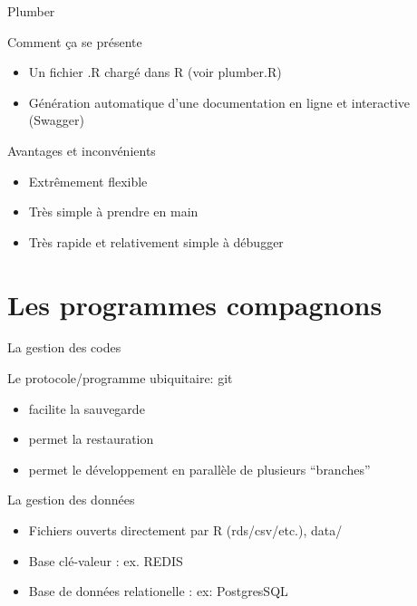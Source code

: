 \documentclass[pdftex,xcolor={table}]{beamer} %
\begin{document}
  \begin{frame}{Plumber}
    \begin{block}{Comment ça se présente}
      \begin{itemize}
        \item Un fichier .R chargé dans R (voir plumber.R)
        \item Génération automatique d'une documentation en ligne et interactive (Swagger)
      \end{itemize}
    \end{block}
    \begin{block}{Avantages et inconvénients}
      \begin{itemize}
        \item Extrêmement flexible
        \item Très simple à prendre en main
        \item Très rapide et relativement simple à débugger
      \end{itemize}
    \end{block}
  \end{frame}
\section{Les programmes compagnons}
  \begin{frame}{La gestion des codes}
    \begin{block}{Le protocole/programme ubiquitaire: git}
      \begin{itemize}
        \item facilite la sauvegarde
        \item permet la restauration
        \item permet le développement en parallèle de plusieurs ``branches''
      \end{itemize}
    \end{block}
  \end{frame}
  \begin{frame}{La gestion des données}
    \begin{itemize}
      \item Fichiers ouverts directement par R (rds/csv/etc.), data/
      \item Base clé-valeur : ex. REDIS 
      \item Base de données relationelle : ex: PostgresSQL
    \end{itemize}
  \end{frame}
\end{document}

